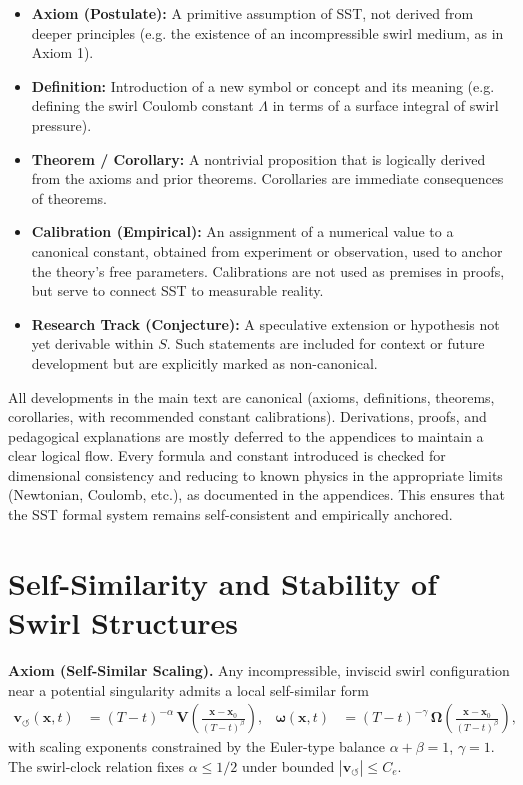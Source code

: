 \documentclass[10pt,reprint,aps,onecolumn,nofootinbib]{revtex4-2}
\begin{document}
    \begin{itemize}
        \item \textbf{Axiom (Postulate):} A primitive assumption of SST, not derived from deeper principles (e.g. the existence of an incompressible swirl medium, as in Axiom 1).
        \item \textbf{Definition:} Introduction of a new symbol or concept and its meaning (e.g. defining the swirl Coulomb constant $\Lambda$ in terms of a surface integral of swirl pressure).
        \item \textbf{Theorem / Corollary:} A nontrivial proposition that is logically derived from the axioms and prior theorems. Corollaries are immediate consequences of theorems.
        \item \textbf{Calibration (Empirical):} An assignment of a numerical value to a canonical constant, obtained from experiment or observation, used to anchor the theory’s free parameters. Calibrations are not used as premises in proofs, but serve to connect SST to measurable reality.
        \item \textbf{Research Track (Conjecture):} A speculative extension or hypothesis not yet derivable within $S$. Such statements are included for context or future development but are explicitly marked as non-canonical.
    \end{itemize}

    All developments in the main text are canonical (axioms, definitions, theorems, corollaries, with recommended constant calibrations). Derivations, proofs, and pedagogical explanations are mostly deferred to the appendices to maintain a clear logical flow. Every formula and constant introduced is checked for dimensional consistency and reducing to known physics in the appropriate limits (Newtonian, Coulomb, etc.), as documented in the appendices. This ensures that the SST formal system remains self-consistent and empirically anchored.


    \section{Self-Similarity and Stability of Swirl Structures}
    \label{sec:self-similarity}

    \textbf{Axiom (Self-Similar Scaling).}
    Any incompressible, inviscid swirl configuration near a potential singularity admits a local
    self-similar form
    \begin{align}
        \mathbf{v}_{\!\boldsymbol{\circlearrowleft}}(\mathbf{x},t)
        &= (T-t)^{-\alpha}\,
        \mathbf{V}\!\left(\frac{\mathbf{x}-\mathbf{x}_0}{(T-t)^{\beta}}\right),
        &
        \boldsymbol{\omega}(\mathbf{x},t)
        &= (T-t)^{-\gamma}\,
        \boldsymbol{\Omega}\!\left(\frac{\mathbf{x}-\mathbf{x}_0}{(T-t)^{\beta}}\right),
    \end{align}
    with scaling exponents constrained by the Euler-type balance
    $\alpha+\beta=1$, $\gamma=1$.  The swirl-clock relation fixes
    \(\alpha \le 1/2\) under bounded
    \(|\mathbf{v}_{\!\boldsymbol{\circlearrowleft}}|\le C_e\).
\end{document}
